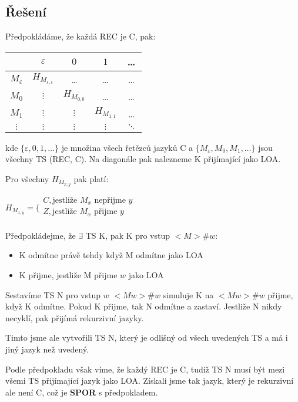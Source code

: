 \documentclass[11pt, a4paper]{article}
\begin{document}
\subsection*{Řešení}
\noindent Předpokládáme, že každá REC je C, pak:

\begin{tabular}{c|cccc}
	                & $\varepsilon$                     & $0$           & $1$           & \ldots   \\
	\hline
	$M_\varepsilon$ & $H_{M_{\varepsilon,\varepsilon}}$ & \ldots        & \ldots        & \ldots   \\
	$M_0$           & $\vdots$                          & $H_{M_{0,0}}$ & \ldots        & \ldots   \\
	$M_1$           & $\vdots$                          & $\vdots$      & $H_{M_{1,1}}$ & \ldots   \\
	$\vdots$        & $\vdots$                          & $\vdots$      & $\vdots$      & $\ddots$
\end{tabular}

\noindent kde $\{\varepsilon, 0, 1, \dots\}$ je množina všech řetězců jazyků C a $\{M_\varepsilon, M_0, M_1, \dots\}$ jsou všechny TS (REC, C). Na diagonále pak nalezneme K přijímající jako LOA.

\noindent Pro všechny $H_{M_{x,y}}$ pak platí:

$H_{M_{x,y}} = \{ \begin{array}{l}
C, \text{jestliže }M_x\text{ nepřijme } y \\
Z, \text{jestliže }M_x\text{ přijme } y \\
\end{array}$

\noindent Předpokládejme, že $\exists$ TS K, pak K pro vstup $<M> \# w$:
\begin{itemize}[label={--},noitemsep]
	\item K odmítne právě tehdy když M odmítne jako LOA
	\item K přijme, jestliže M přijme $w$ jako LOA
\end{itemize}

\noindent Sestavíme TS N pro vstup $w$ $<Mw> \# w$ simuluje K na $<Mw> \# w$ přijme, když K odmítne. Pokud K přijme, tak N odmítne a zastaví. Jestliže N nikdy necyklí, pak přijímá rekurzivní jazyky.

\noindent Timto jsme ale vytvořili TS N, který je odlišný od všech uvedených TS a má i jiný jazyk než uvedený.

\noindent Podle předpokladu však víme, že každý REC je C, tudíž TS N musí být mezi všemi TS přijímající jazyk jako LOA. Získali jsme tak jazyk, který je rekurzivní ale není C, což je \textbf{SPOR} s předpokladem.
\end{document}
